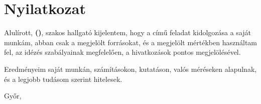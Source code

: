 \enfalse
\hutrue
{}
\chapter*{Nyilatkozat}

\noindent
Alulírott, \textbf{\szerzoVezeteknev{} \szerzoKeresztnev{} (\szerzoNeptun)}, \szak{} szakos hallgató kijelentem, hogy a \textit{\cim} című \MakeLowercase{\doktipus{}} feladat kidolgozása a saját munkám, abban csak a megjelölt forrásokat, és a megjelölt mértékben használtam fel, az idézés szabályainak megfelelően, a hivatkozások pontos megjelölésével.

\setlength\parskip{\baselineskip}

\noindent
Eredményeim saját munkán, számításokon, kutatáson, valós méréseken alapulnak, és a legjobb tudásom szerint hitelesek.

\vspace*{24pt}
\begin{multicols}{2}
	\noindent
	Győr, 

	\columnbreak
	\noindent
	\makebox[7cm][c]{\rule{6cm}{.4pt}}\\
	\makebox[7cm][c]{\emph{\szerzoVezeteknev{} \szerzoKeresztnev}}\\
\end{multicols}

\thispagestyle{empty}

\vfill
\clearpage
\thispagestyle{empty} %

\selectthesislanguage
